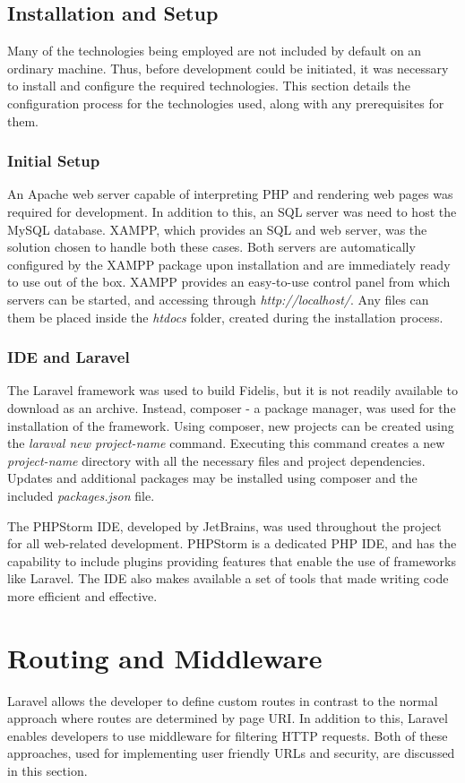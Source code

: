 \subsection{Installation and Setup}
Many of the technologies being employed are not included by default on an ordinary machine. Thus, before development could be initiated, it was necessary to install and configure the required technologies. This section details the configuration process for the technologies used, along with any prerequisites for them.

\subsubsection{Initial Setup}
An Apache web server capable of interpreting PHP and rendering web pages was required for development. In addition to this, an SQL server was need to host the MySQL database. XAMPP, which provides an SQL and web server, was the solution chosen to handle both these cases. Both servers are automatically configured by the XAMPP package upon installation and are immediately ready to use out of the box. XAMPP provides an easy-to-use control panel from which servers can be started, and accessing through \textit{http://localhost/}. Any files can them be placed inside the \textit{htdocs} folder, created during the installation process.

\subsubsection{IDE and Laravel}
The Laravel framework was used to build Fidelis, but it is not readily available to download as an archive. Instead, composer - a package manager, was used for the installation of the framework. Using composer, new projects can be created using the \textit{laraval new project-name} command. Executing this command creates a new \textit{project-name} directory with all the necessary files and project dependencies. Updates and additional packages may be installed using composer and the included \textit{packages.json} file.

The PHPStorm IDE, developed by JetBrains, was used throughout the project for all web-related development. PHPStorm is a dedicated PHP IDE, and has the capability to include plugins providing features that enable the use of frameworks like Laravel. The IDE also makes available a set of tools that made writing code more efficient and effective. 

\section{Routing and Middleware}
Laravel allows the developer to define custom routes in contrast to the normal approach where routes are determined by page URI. In addition to this, Laravel enables developers to use middleware for filtering HTTP requests. Both of these approaches, used for implementing user friendly URLs and security, are discussed in this section.

